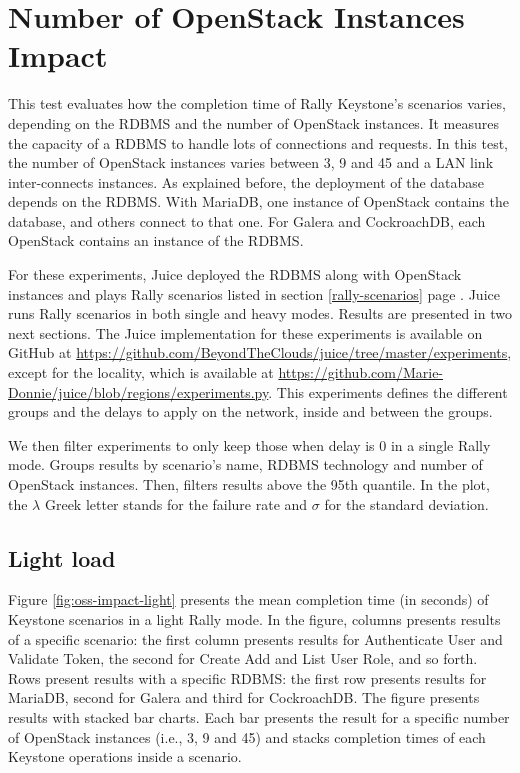 \section{Number of OpenStack Instances Impact}

This test evaluates how the completion time of Rally Keystone’s scenarios varies, depending on the RDBMS and the number of OpenStack instances. It measures the capacity of a RDBMS to handle lots of connections and requests. In this test, the number of OpenStack instances varies between 3, 9 and 45 and a LAN link inter-connects instances. As explained before, the deployment of the database depends on the RDBMS. With MariaDB, one instance of OpenStack contains the database, and others connect to that one. For Galera and CockroachDB, each OpenStack contains an instance of the RDBMS.

For these experiments, Juice deployed the RDBMS along with OpenStack instances and plays Rally scenarios listed in section \ref{rally-scenarios} page \pageref{rally-scenarios}. Juice runs Rally scenarios in both single and heavy modes. Results are presented in two next sections. The Juice implementation for these experiments is available on GitHub at \url{https://github.com/BeyondTheClouds/juice/tree/master/experiments}, except for the locality, which is available at \url{https://github.com/Marie-Donnie/juice/blob/regions/experiments.py}. This experiments defines the different groups and the delays to apply on the network, inside and between the groups.

We then filter experiments to only keep those when delay is 0 in a single Rally mode. Groups results by scenario’s name, RDBMS technology and number of OpenStack instances. Then, filters results above the 95th quantile. In the plot, the $\lambda$ Greek letter stands for the failure rate and $\sigma$ for the standard deviation.

\subsection{Light load}

Figure \ref{fig:oss-impact-light} presents the mean completion time (in seconds) of Keystone scenarios in a light Rally mode. In the figure, columns presents results of a specific scenario: the first column presents results for Authenticate User and Validate Token, the second for Create Add and List User Role, and so forth. Rows present results with a specific RDBMS: the first row presents results for MariaDB, second for Galera and third for CockroachDB. The figure presents results with stacked bar charts. Each bar presents the result for a specific number of OpenStack instances (i.e., 3, 9 and 45) and stacks completion times of each Keystone operations inside a scenario.

